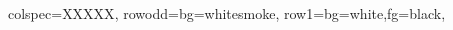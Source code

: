 \begin{adjustbox}{center,max width=0.95\linewidth}
    \noindent%
    \begin{tblr}{
      colspec={XXXXX},
      row{odd}={bg=whitesmoke},  
      row{1}={bg=white,fg=black},
    }

    \end{tblr}
    \end{adjustbox}




